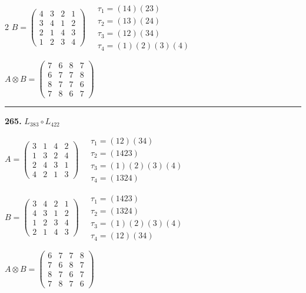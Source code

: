 \begin{multicols}{2}
$B = \begin{pmatrix} 4 & 3 & 2 & 1 \\ 3 & 4 & 1 & 2 \\ 2 & 1 & 4 & 3 \\ 1 & 2 & 3 & 4 \end{pmatrix} \quad \begin{matrix} \tau_{1}=(1 4)(2 3) \\ \tau_{2}=(1 3)(2 4) \\ \tau_{3}=(1 2)(3 4) \\ \tau_{4}=(1)(2)(3)(4) \end{matrix}$

$A \otimes B = \begin{pmatrix} 7 & 6 & 8 & 7 \\ 6 & 7 & 7 & 8 \\ 8 & 7 & 7 & 6 \\ 7 & 8 & 6 & 7 \end{pmatrix}$

\vspace{0.3em}
\hrule
\vspace{0.3em}

\noindent\textbf{265.} $L_{383} \circ L_{422}$

$A = \begin{pmatrix} 3 & 1 & 4 & 2 \\ 1 & 3 & 2 & 4 \\ 2 & 4 & 3 & 1 \\ 4 & 2 & 1 & 3 \end{pmatrix} \quad \begin{matrix} \tau_{1}=(1 2)(3 4) \\ \tau_{2}=(1 4 2 3) \\ \tau_{3}=(1)(2)(3)(4) \\ \tau_{4}=(1 3 2 4) \end{matrix}$

$B = \begin{pmatrix} 3 & 4 & 2 & 1 \\ 4 & 3 & 1 & 2 \\ 1 & 2 & 3 & 4 \\ 2 & 1 & 4 & 3 \end{pmatrix} \quad \begin{matrix} \tau_{1}=(1 4 2 3) \\ \tau_{2}=(1 3 2 4) \\ \tau_{3}=(1)(2)(3)(4) \\ \tau_{4}=(1 2)(3 4) \end{matrix}$

$A \otimes B = \begin{pmatrix} 6 & 7 & 7 & 8 \\ 7 & 6 & 8 & 7 \\ 8 & 7 & 6 & 7 \\ 7 & 8 & 7 & 6 \end{pmatrix}$


\end{multicols}
